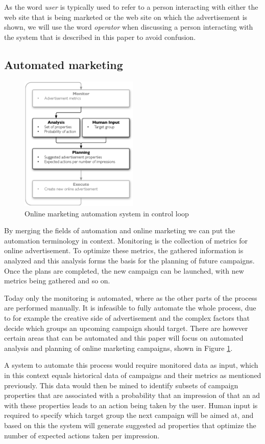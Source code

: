 \documentclass[10pt,twocolumn]{article}
\begin{document}
As the word \emph{user} is typically used to refer to a person interacting with either the web site that is being marketed or the web site on which the advertisement is shown, we will use the word \emph{operator} when discussing a person interacting with the system that is described in this paper to avoid confusion.

\subsection{Automated marketing}
\begin{figure}[htb] \centering \includegraphics[width=0.5\textwidth]{mape-marketing.eps}
	\caption{Online marketing automation system in control loop}
	\label{fig:MAPEMarketing}
\end{figure}

By merging the fields of automation and online marketing we can put the automation terminology in context. Monitoring is the collection of metrics for online advertisement. To optimize these metrics, the gathered information is analyzed and this analysis forms the basis for the planning of future campaigns. Once the plans are completed, the new campaign can be launched, with new metrics being gathered and so on.

Today only the monitoring is automated, where as the other parts of the process are performed manually. It is infeasible to fully automate the whole process, due to for example the creative side of advertisement and the complex factors that decide which groups an upcoming campaign should target. There are however certain areas that can be automated and this paper will focus on automated analysis and planning of online marketing campaigns, shown in Figure \ref{fig:MAPEMarketing}.

A system to automate this process would require monitored data as input, which in this context equals historical data of campaigns and their metrics as mentioned previously. This data would then be mined to identify subsets of campaign properties that are associated with a probability that an impression of that an ad with these properties leads to an action being taken by the user. Human input is required to specify which target group the next campaign will be aimed at, and based on this the system will generate suggested ad properties that optimize the number of expected actions taken per impression.
\end{document}
